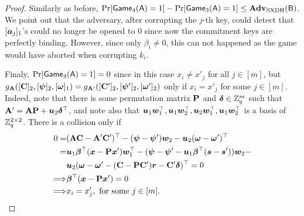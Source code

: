 \begin{proof}
Similarly as before, $\Pr[\mathsf{Game}_4(\mathsf{A})=1]-\Pr[\mathsf{Game}_3(\mathsf{A})=1]\leq\mathbf{Adv}_\mathrm{SXDH}(\mathsf{B})$. We point out that the adversary, after corrupting the $j$-th key, could detect that $[{\boldsymbol{a}}_j]_1$'s  could no longer be opened to 0 since now the commitment keys are perfectly binding. However, since only $\beta_i\neq 0$, this can not happened as the game would have aborted when corrupting $k_i$.

Finaly, $\Pr[\mathsf{Game}_4(\mathsf{A})=1]=0$ since in this case $x_i \neq x'_j$ for all $j\in[m]$, but $g_{\mathbf{{A}}}([\mathbf{{C}}]_2,[{\boldsymbol{\psi}}]_2,\allowbreak[{\boldsymbol{\omega}}]_1)=g_{\mathbf{{A}}'}([\mathbf{{C}}']_2,[{\boldsymbol{\psi}}']_2,[{\boldsymbol{\omega}}']_2)$  only if $x_i = x'_j$ for some $j\in[m]$. Indeed, note that there is some permutation matrix $\mathbf{{P}}$ and ${\boldsymbol{\delta}}\in\mathbb{Z}_q^m$ such that $\mathbf{{A}}'  = \mathbf{{A}}\mathbf{{P}}+{\boldsymbol{u}}_2{\boldsymbol{\delta}}^\top$, and note also that ${\boldsymbol{u}}_1{\boldsymbol{w}}_1^\top,{\boldsymbol{u}}_1{\boldsymbol{w}}_2^\top,{\boldsymbol{u}}_2{\boldsymbol{w}}_1^\top,{\boldsymbol{u}}_1{\boldsymbol{w}}_2^\top$ is a basis of $\mathbb{Z}_q^{2\times 2}$. There is a collision only if
\begin{align*}
0=&(\matr{A}\matr{C}-\matr{A}'\matr{C}')^\top - (\vec{\psi}-\vecb{\psi}')\vecb{w}_2 - \vecb{u}_2(\vecb{\omega}-\vecb{\omega}')^\top\\
=&\vecb{u}_1\vecb{\beta}^\top(\vecb{x}-\matr{P}\vecb{x}')\vecb{w}_1^\top - (\vec{\psi}-\vecb{\psi}'-\vecb{u}_1\vecb{\beta}^\top(\vecb{s}-\vecb{s}'))\vecb{w}_2 - \\
&\vecb{u}_2(\vecb{\omega}-\vecb{\omega}'-(\matr{C}-\matr{P}\matr{C}')\vecb{r}-\matr{C}'\vecb{\delta})^\top = 0\\
\Longrightarrow  &\vecb{\beta}^\top(\vecb{x}-\matr{P}\vecb{x}')=0\\
\Longrightarrow  &x_i  = x'_j,\text{ for some }j\in[m].\\
\end{align*}
\end{proof}